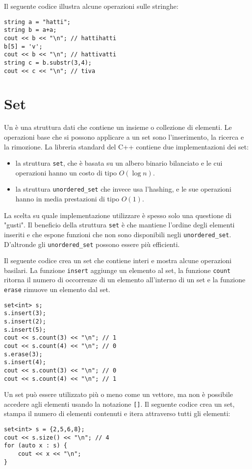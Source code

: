 Il seguente codice illustra alcune operazioni sulle stringhe:

\begin{lstlisting}
string a = "hatti";
string b = a+a;
cout << b << "\n"; // hattihatti
b[5] = 'v';
cout << b << "\n"; // hattivatti
string c = b.substr(3,4);
cout << c << "\n"; // tiva
\end{lstlisting}

\section{Set}


Un  è una struttura dati che contiene un 
insieme o collezione di elementi.
Le operazioni base che si possono applicare a un set
sono l'inserimento, la ricerca e la rimozione. 
La libreria standard del C++ contiene due implementazioni
dei set:
\begin{itemize}
\item la struttura \texttt{set}, che è basata su un albero binario bilanciato e 
le cui operazioni hanno un costo di tipo $O(\log n)$.
\item la struttura \texttt{unordered\_set} che invece usa l'hashing,
e le sue operazioni hanno in media prestazioni di tipo $O(1)$.
\end{itemize}

La scelta su quale implementazione utilizzare
è spesso solo una questione di "gusti".
Il beneficio della struttura \texttt{set} 
è che mantiene l'ordine degli elementi inseriti e
che espone funzioni che non sono disponibili negli
\texttt{unordered\_set}.
D'altronde gli \texttt{unordered\_set}
possono essere più efficienti.

Il seguente codice crea un set che contiene interi e mostra
alcune operazioni basilari.
La funzione \texttt{insert} aggiunge un elemento al set,
la funzione \texttt{count} ritorna il numero di occorrenze 
di un elemento all'interno di un set
e la funzione \texttt{erase} rimuove un elemento dal set.

\begin{lstlisting}
set<int> s;
s.insert(3);
s.insert(2);
s.insert(5);
cout << s.count(3) << "\n"; // 1
cout << s.count(4) << "\n"; // 0
s.erase(3);
s.insert(4);
cout << s.count(3) << "\n"; // 0
cout << s.count(4) << "\n"; // 1
\end{lstlisting}

Un set può essere utilizzato più o meno come un vettore,
ma non è possibile accedere agli elementi
usando la notazione \texttt{[]}.
Il seguente codice crea un set,
stampa il numero di elementi contenuti e itera
attraverso tutti gli elementi:
\begin{lstlisting}
set<int> s = {2,5,6,8};
cout << s.size() << "\n"; // 4
for (auto x : s) {
    cout << x << "\n";
}
\end{lstlisting}


